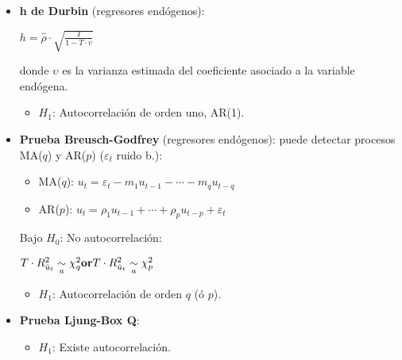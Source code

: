 \documentclass[10pt, a4paper, landscape]{article}
\begin{document}
\begin{multicols}{3}
\begin{itemize}[leftmargin=*]
\begin{itemize}[leftmargin=*]
				\item \textbf{h de Durbin} (regresores endógenos):
				
				\begin{center}
					$h = \hat{\rho} \cdot \sqrt{\frac{T}{1 - T \cdot \upsilon}}$
				\end{center}
				
				donde $\upsilon$ es la varianza estimada del coeficiente asociado a la variable endógena.
				
				\begin{itemize}[leftmargin=*]
					\item $H_{1}$: Autocorrelación de orden uno, AR(1).
				\end{itemize}
				
				\item \textbf{Prueba Breusch-Godfrey} (regresores endógenos): puede detectar procesos MA($q$) y AR($p$) ($\varepsilon_{t}$ ruido b.):
				
				\begin{itemize}[leftmargin=*]
					\item MA($q$): $u_{t} = \varepsilon_{t} - m_{1} u_{t - 1} - \cdots - m_{q} u_{t - q}$
					\item AR($p$): $u_{t} = \rho_{1} u_{t - 1} + \cdots + \rho_{p} u_{t - p}+ \varepsilon_{t}$
				\end{itemize}
				
			\columnbreak
				
				Bajo $H_{0}$: No autocorrelación:
				
				\begin{center}
					$\hfill T \cdot R^{2}_{\hat{u}_t}\underset{a}{\sim}\chi^{2}_{q} \hfill \textbf{or} \hfill T \cdot R^{2}_{\hat{u}_t}\underset{a}{\sim}\chi^{2}_{p} \hfill$
				\end{center}
				
				\begin{itemize}[leftmargin=*]
					\item $H_{1}$: Autocorrelación de orden $q$ (ó $p$).
				\end{itemize}
				
				\item \textbf{Prueba Ljung-Box Q}:
				
				\begin{itemize}[leftmargin=*]
					\item $H_{1}$: Existe autocorrelación.
				\end{itemize}
			\end{itemize}
		\end{itemize}
		

\end{multicols}
\end{document}
